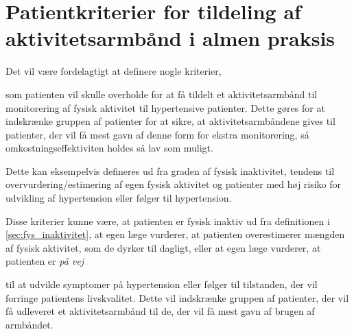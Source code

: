 \section{Patientkriterier for tildeling af aktivitetsarmbånd i almen praksis}

\noindent
Det vil være fordelagtigt at definere nogle kriterier, %

som patienten vil skulle overholde for at få tildelt et aktivitetsarmbånd til monitorering af fysisk aktivitet til hypertensive patienter. Dette gøres for at indskrænke gruppen af patienter for at sikre, at aktivitetsarmbåndene gives til patienter, der vil få mest gavn af denne form for ekstra monitorering, så omkostningseffektiviten holdes så lav som muligt.

Dette kan eksempelvis defineres ud fra graden af fysisk inaktivitet, tendens til overvurdering/estimering af egen fysisk aktivitet og patienter med høj risiko for udvikling af hypertension eller følger til hypertension. 

Disse kriterier kunne være, at patienten er fysisk inaktiv ud fra definitionen i \autoref{sec:fys_inaktivitet}, at egen læge vurderer, at patienten overestimerer mængden af fysisk aktivitet, som de dyrker til dagligt, eller at egen læge vurderer, at patienten er \textit{på vej} %

 til at udvikle symptomer på hypertension eller følger til tilstanden, der vil forringe patientens livskvalitet. Dette vil indskrænke gruppen af patienter, der vil få udleveret et aktivitetsarmbånd til de, der vil få mest gavn af brugen af armbåndet. 


